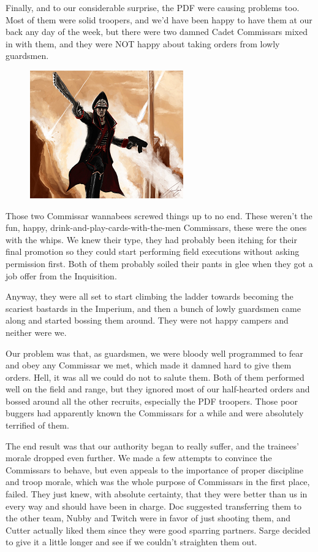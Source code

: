 Finally, and to our considerable surprise, the PDF were causing problems too. 
Most of them were solid troopers, and we’d have been happy to have them at our back any day of the week, but there were two damned Cadet Commissars mixed in with them, and they were NOT happy about taking orders from lowly guardsmen. 


\begin{figure}
	\begin{center}
		\includegraphics[width=\figwidth]{pics/8/14.png}
	\end{center}
\end{figure}
Those two Commissar wannabees screwed things up to no end. 
These weren’t the fun, happy, drink-and-play-cards-with-the-men Commissars, these were the ones with the whips. 
We knew their type, they had probably been itching for their final promotion so they could start performing field executions without asking permission first. 
Both of them probably soiled their pants in glee when they got a job offer from the Inquisition. 


Anyway, they were all set to start climbing the ladder towards becoming the scariest bastards in the Imperium, and then a bunch of lowly guardsmen came along and started bossing them around. 
They were not happy campers and neither were we.

Our problem was that, as guardsmen, we were bloody well programmed to fear and obey any Commissar we met, which made it damned hard to give them orders. 
Hell, it was all we could do not to salute them. 
Both of them performed well on the field and range, but they ignored most of our half-hearted orders and bossed around all the other recruits, especially the PDF troopers. 
Those poor buggers had apparently known the Commissars for a while and were absolutely terrified of them.

The end result was that our authority began to really suffer, and the trainees’ morale dropped even further. 
We made a few attempts to convince the Commissars to behave, but even appeals to the importance of proper discipline and troop morale, which was the whole purpose of Commissars in the first place, failed. 
They just knew, with absolute certainty, that they were better than us in every way and should have been in charge. 
Doc suggested transferring them to the other team, Nubby and Twitch were in favor of just shooting them, and Cutter actually liked them since they were good sparring partners. 
Sarge decided to give it a little longer and see if we couldn’t straighten them out.

